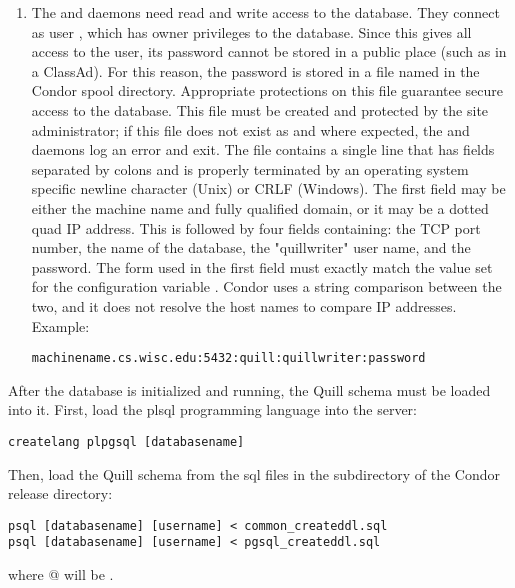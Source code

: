 \begin{enumerate}
\item The  and  daemons need read and write access
to the database.
They connect as user ,
which has owner privileges to the database.
Since this gives all access to the  user,
its password cannot be stored in a public place 
(such as in a ClassAd).
For this reason, the  password is stored
in a file named  in the Condor spool directory.
Appropriate protections on this file guarantee secure access to the database.
This file must be created and protected by the site administrator;
if this file does not exist as and where expected, the 
and  daemons log an error and exit.
The  file contains a single line that
has fields separated by colons and is properly terminated by
an operating system specific newline character (Unix) or CRLF (Windows).
The first field may be either the machine name and fully qualified domain,
or it may be a dotted quad IP address.
This is followed by four fields containing:
the TCP port number, 
the name of the database,
the "quillwriter" user name,
and the password.
The form used in the first field must exactly match the value set for 
the configuration variable .
Condor uses a string comparison between the two, and it does not resolve the
host names to compare IP addresses.
Example:
\footnotesize
\begin{verbatim}
machinename.cs.wisc.edu:5432:quill:quillwriter:password
\end{verbatim}
\normalsize

\end{enumerate}

After the  database is initialized and running, 
the Quill schema
must be loaded into it.  First, load the plsql programming language
into the server:

\begin{verbatim}
createlang plpgsql [databasename]
\end{verbatim}

Then, load the Quill schema from the sql files in the  subdirectory
of the Condor release directory:

\begin{verbatim}
psql [databasename] [username] < common_createddl.sql
psql [databasename] [username] < pgsql_createddl.sql
\end{verbatim}
where \verb@[username]@ will be \verb@quillwriter@.


